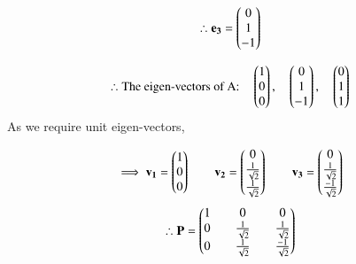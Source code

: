 \documentclass[journal]{IEEEtran}
\begin{document}
\newpage
\vspace*{0.25cm}

\begin{align}
    \therefore \mathbf{e_3}=\begin{pmatrix}0\\1\\-1\end{pmatrix}
\end{align}


\begin{align}
    \therefore \text{The eigen-vectors of A:}\quad \begin{pmatrix}1\\0\\0\end{pmatrix},\quad \begin{pmatrix}0\\1\\-1\end{pmatrix},\quad \begin{pmatrix}0\\1\\1\end{pmatrix}
\end{align}
As we require unit eigen-vectors,

\begin{align}
    \implies \mathbf{v_1}=\begin{pmatrix}1\\0\\0\end{pmatrix} \qquad \mathbf{v_2}=\begin{pmatrix}0\\\frac{1}{\sqrt{2}}\\\frac{1}{\sqrt{2}}\end{pmatrix} \qquad \mathbf{v_3}=\begin{pmatrix}0\\\frac{1}{\sqrt{2}}\\\frac{-1}{\sqrt{2}}\end{pmatrix}
\end{align}
\begin{align}
    \therefore \mathbf{P}=\begin{pmatrix}1&&0&&0\\0&&\frac{1}{\sqrt{2}}&&\frac{1}{\sqrt{2}}\\0&&\frac{1}{\sqrt{2}}&&\frac{-1}{\sqrt{2}}\end{pmatrix}
\end{align}
\end{document}
